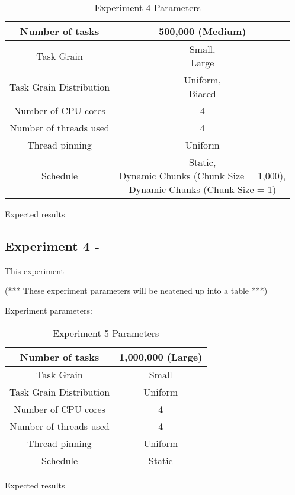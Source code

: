 \begin{table}
\centering
	\begin{tabular}{|c|c|}
		\hline
		Number of tasks & 500,000 (Medium) \\
		\hline
		Task Grain & \specialcell{Small, \\ Large} \\
		\hline
		Task Grain Distribution & \specialcell{Uniform, \\ Biased} \\
		\hline
		Number of CPU cores & 4 \\
		\hline
		Number of threads used & 4 \\
		\hline
		Thread pinning & Uniform \\
		\hline
		Schedule & \specialcell{Static, \\ Dynamic Chunks (Chunk Size = 1,000), \\ Dynamic Chunks (Chunk Size = 1)} \\
		\hline
	\end{tabular}
\caption{Experiment 4 Parameters}
\label{table:ex4_parameters}
\end{table}



Expected results



\subsection{Experiment 4 - }

This experiment



(*** These experiment parameters will be neatened up into a table ***)

Experiment parameters:

\begin{table}
\centering
	\begin{tabular}{|c|c|}
		\hline
		Number of tasks & 1,000,000 (Large) \\
		\hline
		Task Grain & Small \\
		\hline
		Task Grain Distribution & Uniform \\
		\hline
		Number of CPU cores & 4 \\
		\hline
		Number of threads used & 4 \\
		\hline
		Thread pinning & Uniform \\
		\hline
		Schedule & Static \\
		\hline
	\end{tabular}
\caption{Experiment 5 Parameters}
\label{table:ex5_parameters}
\end{table}



Expected results